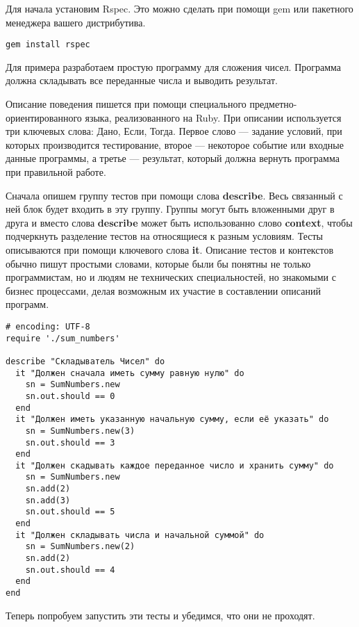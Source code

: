 Для начала установим Rspec. Это можно сделать при помощи gem или пакетного менеджера вашего дистрибутива.

\begin{verbatim}
gem install rspec
\end{verbatim}


Для примера разработаем простую программу для сложения чисел. Программа должна складывать все переданные числа и выводить результат.

Описание поведения пишется при помощи специального предметно-ориентированного языка, реализованного на Ruby. При описании используется три ключевых слова: Дано, Если, Тогда. Первое слово --- задание условий, при которых производится тестирование, второе --- некоторое событие или входные данные программы, а третье --- результат, который должна вернуть программа при правильной работе.

Сначала опишем группу тестов при помощи слова \textbf{describe}. Весь связанный с ней блок будет входить в эту группу. Группы могут быть вложенными друг в друга и вместо слова \textbf{describe} может быть использованно слово \textbf{context}, чтобы подчеркнуть разделение тестов на относящиеся к разным условиям. Тесты описываются при помощи ключевого слова \textbf{it}. Описание тестов и контекстов обычно пишут простыми словами, которые были бы понятны не только программистам, но и людям не технических специальностей, но знакомыми с бизнес процессами, делая возможным их участие в составлении описаний программ.

\begin{verbatim}
# encoding: UTF-8
require './sum_numbers'

describe "Складыватель Чисел" do
  it "Должен сначала иметь сумму равную нулю" do
    sn = SumNumbers.new
    sn.out.should == 0
  end
  it "Должен иметь указанную начальную сумму, если её указать" do
    sn = SumNumbers.new(3)
    sn.out.should == 3
  end
  it "Должен скадывать каждое переданное число и хранить сумму" do
	sn = SumNumbers.new
    sn.add(2)
    sn.add(3)
    sn.out.should == 5
  end
  it "Должен складывать числа и начальной суммой" do
    sn = SumNumbers.new(2)
    sn.add(2)
    sn.out.should == 4
  end
end
\end{verbatim}

Теперь попробуем запустить эти тесты и убедимся, что они не проходят.

